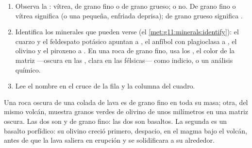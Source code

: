
\begin{method}\label{met:g11:igneous-rocks:naming}
\begin{enumerate}
  \item Observa la : vítrea, de grano fino o de grano grueso;
         o no. De grano fino o vítrea significa  (o una
         pequeña, enfriada deprisa); de grano grueso significa .
  \item Identifica los minerales que pueden verse
        (el \cref{met:g11:minerals:identify}): el cuarzo y el feldespato
        potásico apuntan a , el anfíbol con plagioclasa a , el
        olivino y el piroxeno a . En una roca de grano fino, usa los
        , el color de la matriz ---oscura en las , clara en
        las félsicas--- como indicio, o un análisis químico.
  \item Lee el nombre en el cruce de la fila y la columna del
        cuadro.
\end{enumerate}
\end{method}

\begin{example}
Una roca oscura de una colada de lava es de grano fino en toda su masa; otra,
del mismo volcán, muestra granos verdes de olivino de unos milímetros en una
matriz oscura. Las dos son  y de grano fino: las dos son basaltos. La
segunda es un basalto porfídico: su olivino creció primero, despacio, en el
magma bajo el volcán, antes de que la lava saliera en erupción y se
solidificara a su alrededor.
\end{example}

